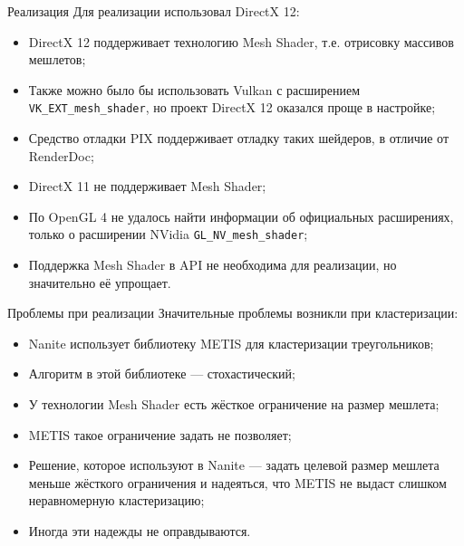 \documentclass{beamer}
\begin{document}
    \begin{frame}{Реализация}
        Для реализации использовал DirectX 12:
        \begin{itemize}
            \item DirectX 12 поддерживает технологию Mesh Shader,
            т.е. отрисовку массивов мешлетов;
            \item Также можно было бы использовать Vulkan
            с расширением \texttt{VK\_EXT\_mesh\_shader},
            но проект DirectX 12 оказался проще в настройке;
            \item Средство отладки PIX поддерживает отладку
            таких шейдеров, в отличие от RenderDoc;
            \item DirectX 11 не поддерживает Mesh Shader;
            \item По OpenGL 4 не удалось найти информации
            об официальных расширениях,
            только о расширении NVidia
            \texttt{GL\_NV\_mesh\_shader};
            \item Поддержка Mesh Shader в API не необходима
            для реализации, но значительно её упрощает.
        \end{itemize}
    \end{frame}

    \begin{frame}{Проблемы при реализации}
        Значительные проблемы возникли при кластеризации:
        \begin{itemize}
            \item Nanite использует библиотеку METIS
            для кластеризации треугольников;
            \item Алгоритм в этой библиотеке --- стохастический;
            \item У технологии Mesh Shader есть жёсткое ограничение
            на размер мешлета;
            \item METIS такое ограничение задать не позволяет;
            \item Решение, которое используют в Nanite
            --- задать целевой размер мешлета меньше
            жёсткого ограничения и надеяться,
            что METIS не выдаст слишком неравномерную кластеризацию;
            \item Иногда эти надежды не оправдываются.
        \end{itemize}
    \end{frame}
\end{document}
